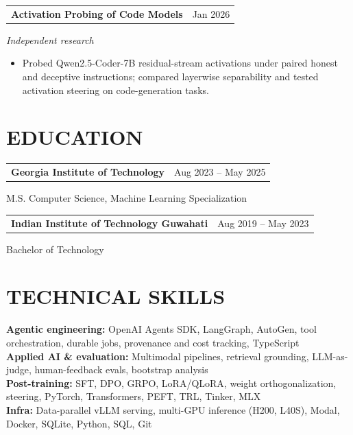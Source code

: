 \documentclass[10pt,letterpaper]{article}
\makeatletter
\newcommand{\entry}[3]{%
  \begin{tabularx}{\linewidth}{@{}X r@{}}\textbf{#1} & {\small #3}\end{tabularx}\par
  {\small\textit{#2}}\par\vspace{1pt}}
\newcommand{\school}[3]{%
  \begin{tabularx}{\linewidth}{@{}X r@{}}\textbf{#1} & {\small #3}\end{tabularx}\par
  {\small #2}\par\vspace{2pt}}
\makeatother
\begin{document}
\entry{Activation Probing of Code Models}{Independent research}{Jan 2026}
\begin{itemize}
  \item Probed Qwen2.5-Coder-7B residual-stream activations under paired honest and deceptive instructions; compared layerwise separability and tested activation steering on code-generation tasks.
\end{itemize}

\section*{EDUCATION}
\school{Georgia Institute of Technology}{M.S. Computer Science, Machine Learning Specialization}{Aug 2023 -- May 2025}
\school{Indian Institute of Technology Guwahati}{Bachelor of Technology}{Aug 2019 -- May 2023}

\section*{TECHNICAL SKILLS}
{\small
\textbf{Agentic engineering:} OpenAI Agents SDK, LangGraph, AutoGen, tool orchestration, durable jobs, provenance and cost tracking, TypeScript\\[2pt]
\textbf{Applied AI \& evaluation:} Multimodal pipelines, retrieval grounding, LLM-as-judge, human-feedback evals, bootstrap analysis\\[2pt]
\textbf{Post-training:} SFT, DPO, GRPO, LoRA/QLoRA, weight orthogonalization, steering, PyTorch, Transformers, PEFT, TRL, Tinker, MLX\\[2pt]
\textbf{Infra:} Data-parallel vLLM serving, multi-GPU inference (H200, L40S), Modal, Docker, SQLite, Python, SQL, Git
}
\end{document}
